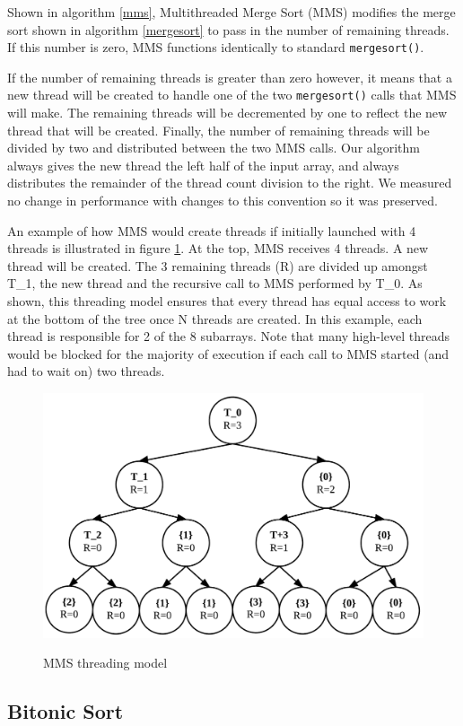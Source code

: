 \documentclass[journal]{IEEEtran}
\begin{document}
Shown in algorithm \ref{mms}, Multithreaded Merge Sort (MMS) modifies the merge sort shown in algorithm \ref{mergesort} to pass in the number of remaining threads.  If this number is zero, MMS functions identically to standard \texttt{mergesort()}. 

If the number of remaining threads is greater than zero however, it means that a new thread will be created to handle one of the two \texttt{mergesort()} calls that MMS will make.  The remaining threads will be decremented by one to reflect the new thread that will be created.  Finally, the number of remaining threads will be divided by two and distributed between the two MMS calls.  Our algorithm always gives the new thread the left half of the input array, and always distributes the remainder of the thread count division to the right.  We measured no change in performance with changes to this convention so it was preserved.  

An example of how MMS would create threads if initially launched with 4 threads is illustrated in figure \ref{mms_thread}.  At the top, MMS receives 4 threads. A new thread will be created.  The 3 remaining threads (R) are divided up amongst T\_1, the new thread and the recursive call to MMS performed by T\_0.  As shown, this threading model ensures that every thread has equal access to work at the bottom of the tree once N threads are created.  In this example, each thread is responsible for 2 of the 8 subarrays.  Note that many high-level threads would be blocked for the majority of execution if each call to MMS started (and had to wait on) two threads.

\begin{figure}[f]
\caption{MMS threading model}
\centering
\includegraphics[width=.5\textwidth]{include/mms.png}
\label{mms_thread}
\end{figure}


\subsection{Bitonic Sort}
\end{document}
